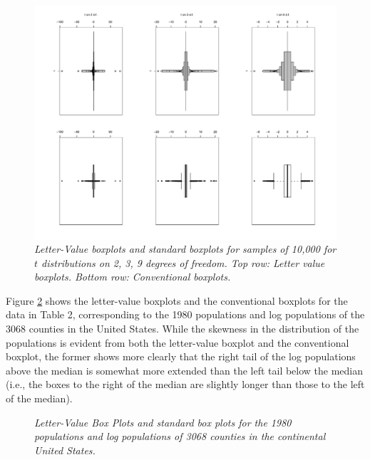 \documentclass[oneside]{article}
\begin{document}
\begin{figure}[hbt]
\begin{center}
\includegraphics[scale=.5,angle=270]{tplot2kk}
\caption{\it \label{t-dist} Letter-Value boxplots and standard boxplots 
for samples of 10,000 for $t$ distributions on 2, 3, 9 degrees of freedom. 
Top row: Letter value boxplots.  Bottom row: Conventional boxplots.}
\end{center}
\end{figure}

Figure \ref{lvpops} shows the letter-value boxplots
and the conventional boxplots for the data in Table 2,
corresponding to the 1980 populations and log populations
of the 3068 counties in the United States.  While the
skewness in the distribution of the populations is
evident from both the letter-value boxplot and the
conventional boxplot, the former shows more clearly
that the right tail of the log populations above the 
median is somewhat more extended than the left tail
below the median (i.e., the boxes to the right of
the median are slightly longer than those to the
left of the median).


\begin{figure}[hbt]
\begin{center}
\caption{\it \label{lvpops} Letter-Value Box Plots and standard 
box plots for the 1980 populations and log populations of 3068
counties in the continental United States.}
\end{center}
\end{figure}
\end{document}
